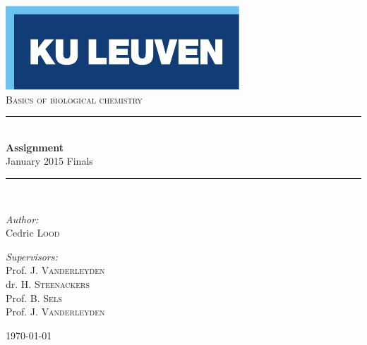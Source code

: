 \begin{titlepage}
  \begin{center}
    
    \includegraphics[scale=1.5]{Figures/kuleuven_logo.pdf}~\\[4.5cm]
    
    \textsc{\Large Basics of biological chemistry}\\[0.5cm]
    
    \rule{\linewidth}{0.3mm}\\[0.4cm]
    {\huge \bfseries Assignment} \\[0.4cm]
    {\large January 2015 Finals} \\[0.4cm]
    \rule{\linewidth}{0.3mm}\\[1.5cm]
    
    \begin{minipage}{0.4\textwidth}
      \begin{flushleft} \large
        \emph{Author:}\\
        Cedric \textsc{Lood}\\
      \end{flushleft}
    \end{minipage}
    \begin{minipage}{0.4\textwidth}
      \begin{flushright} \large
        \emph{Supervisors:} \\
        Prof. J. \textsc{Vanderleyden}\\
        dr. H. \textsc{Steenackers}\\
        Prof. B. \textsc{Sels}\\
        Prof. J. \textsc{Vanderleyden}
      \end{flushright}
    \end{minipage}
    
    \vfill
    
    {\large \today}
    
  \end{center}
\end{titlepage}
